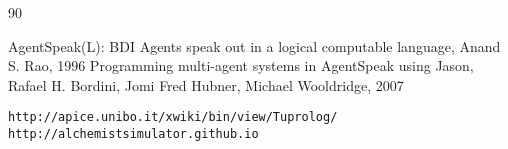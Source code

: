 \documentclass[12pt,a4paper,openright,twoside]{report}
\theoremstyle{plain}
\theoremstyle{definition}
\begin{document}


\makeatletter
\renewcommand\@bibitem[1]
{
  \item\if@filesw \immediate\write\@auxout
  {\string\bibcite{#1}{Bib. \the\value{\@listctr}}}\fi\ignorespaces
}%
\def\@biblabel#1{[Bib. #1]}%
\makeatother

\begin{thebibliography}{90} %
\rhead[\fancyplain{}{\bfseries \leftmark}]{\fancyplain{}{\bfseries \thepage}}


 AgentSpeak(L): BDI Agents speak out in a logical computable language, Anand S. Rao, 1996
 Programming multi-agent systems in AgentSpeak using Jason, Rafael H. Bordini, Jomi Fred Hubner, Michael Wooldridge, 2007

\end{thebibliography}


\makeatletter
\let\@orig@endthebibliography\endthebibliography
\renewcommand\endthebibliography
{
  \xdef\@kept@last@number{\the\c@enumiv}%
  \@orig@endthebibliography
}

\newenvironment{thesitography}[1]
{\def\bibname{Sitografia}%
   \thebibliography{#1}%
}
{\@orig@endthebibliography}

\renewcommand\@bibitem[1]
{
  \item\if@filesw \immediate\write\@auxout
  {\string\bibcite{#1}{Sit. \the\value{\@listctr}}}\fi\ignorespaces
}%
\def\@biblabel#1{[Sit. #1]}%
\makeatother

{\fancyplain{}{\bfseries\thepage}}
\begin{thesitography}{90} %
\rhead[\fancyplain{}{\bfseries \leftmark}]{\fancyplain{}{\bfseries \thepage}}


 \texttt{http://apice.unibo.it/xwiki/bin/view/Tuprolog/}
 \texttt{http://alchemistsimulator.github.io}
\end{thesitography}

\end{document}
